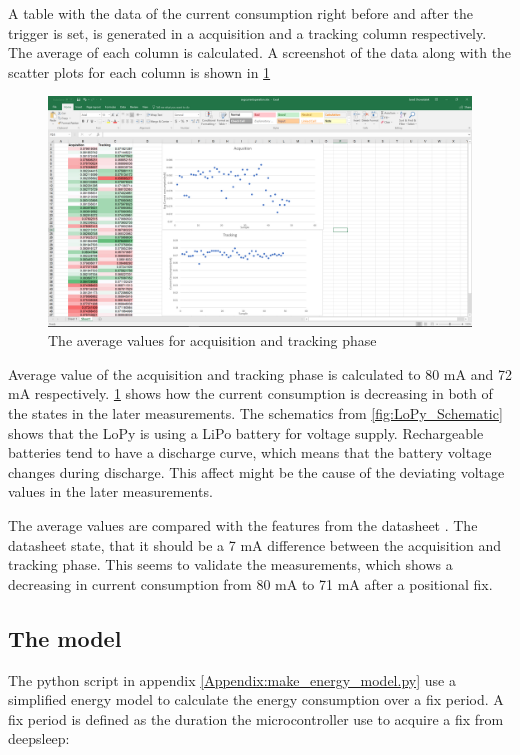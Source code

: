 A table with the data of the current consumption right before and after the trigger is set, is generated in a acquisition and a tracking column respectively. The average of each column is calculated. A screenshot of the data along with the scatter plots for each column is shown in \ref{fig:average}
 
\begin{figure}[H]
\centering
\includegraphics[width=15 cm]{Project_Report/Images/average.PNG}
\caption{The average values for acquisition and tracking phase }
\label{fig:average}
\end{figure}
 
 Average value of the acquisition and tracking phase is calculated to 80 mA and 72 mA respectively. \ref{fig:average} shows how the current consumption is decreasing in both of the states in the later measurements. The schematics from \ref{fig:LoPy_Schematic} shows that the LoPy is using a LiPo battery for voltage supply. Rechargeable batteries  tend to have a discharge curve, which means that the battery voltage changes during discharge. This affect might be the cause of the deviating voltage values in the later measurements. 
 
 The average values are compared with the features from the datasheet \cite{L76}. The datasheet state, that it should be a 7 mA difference between the acquisition and tracking phase. This seems to validate the measurements, which shows a decreasing in current consumption from 80 mA to 71 mA after a positional fix.   
 
 
\subsection{The model}
 
 
The python script in appendix \ref{Appendix:make_energy_model.py} use a simplified energy model to calculate the energy consumption over a fix period.
A fix period is defined as the duration the microcontroller use to acquire a fix from deepsleep:

